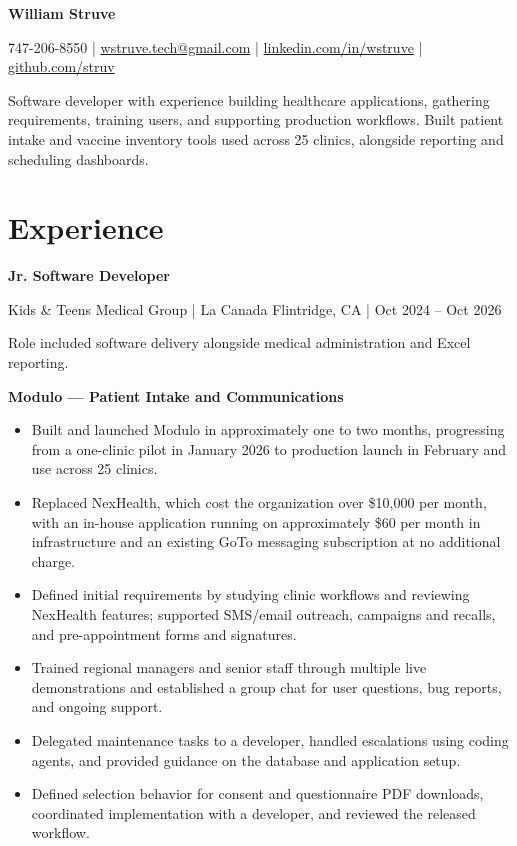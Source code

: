 \documentclass[10pt,letterpaper]{article}
\begin{document}
{\LARGE\bfseries William Struve}\par
747-206-8550 \enspace | \enspace
\href{mailto:wstruve.tech@gmail.com}{wstruve.tech@gmail.com} \enspace | \enspace
\href{https://linkedin.com/in/wstruve}{linkedin.com/in/wstruve} \enspace | \enspace
\href{https://github.com/struv}{github.com/struv}

Software developer with experience building healthcare applications, gathering requirements, training users, and supporting production workflows. Built patient intake and vaccine inventory tools used across 25 clinics, alongside reporting and scheduling dashboards.

\section{Experience}
\textbf{Jr. Software Developer}\par
Kids \& Teens Medical Group | La Canada Flintridge, CA | Oct 2024 -- Oct 2026\par
Role included software delivery alongside medical administration and Excel reporting.

\textbf{Modulo --- Patient Intake and Communications}\par
\begin{itemize}
\item Built and launched Modulo in approximately one to two months, progressing from a one-clinic pilot in January 2026 to production launch in February and use across 25 clinics.
\item Replaced NexHealth, which cost the organization over \$10,000 per month, with an in-house application running on approximately \$60 per month in infrastructure and an existing GoTo messaging subscription at no additional charge.
\item Defined initial requirements by studying clinic workflows and reviewing NexHealth features; supported SMS/email outreach, campaigns and recalls, and pre-appointment forms and signatures.
\item Trained regional managers and senior staff through multiple live demonstrations and established a group chat for user questions, bug reports, and ongoing support.
\item Delegated maintenance tasks to a developer, handled escalations using coding agents, and provided guidance on the database and application setup.
\item Defined selection behavior for consent and questionnaire PDF downloads, coordinated implementation with a developer, and reviewed the released workflow.
\end{itemize}
\end{document}
